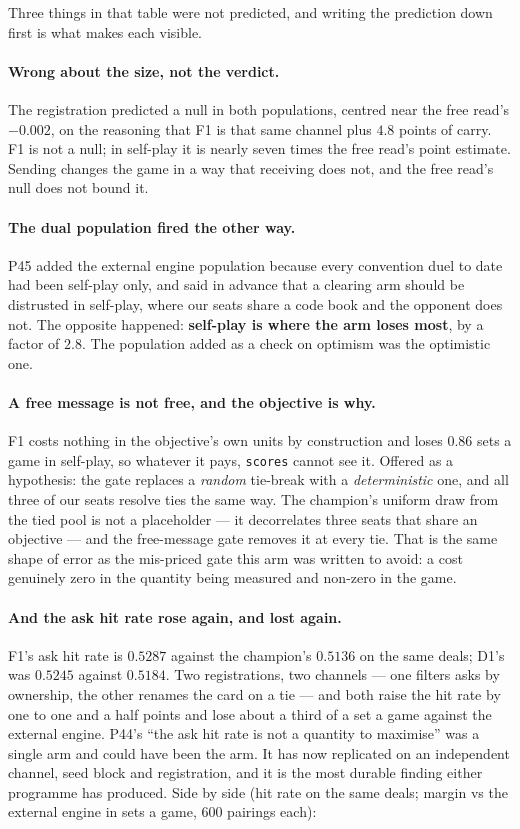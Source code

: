 \documentclass[11pt,letterpaper]{article}
\begin{document}
\noindent Three things in that table were not predicted, and writing the
prediction down first is what makes each visible.

\paragraph{Wrong about the size, not the verdict.} The registration predicted a
null in both populations, centred near the free read's $-0.002$, on the
reasoning that F1 is that same channel plus $4.8$ points of carry. F1 is not a
null; in self-play it is nearly seven times the free read's point estimate.
Sending changes the game in a way that receiving does not, and the free read's
null does not bound it.

\paragraph{The dual population fired the other way.} P45 added the external engine
population because every convention duel to date had been self-play only, and
said in advance that a clearing arm should be distrusted in self-play, where our
seats share a code book and the opponent does not. The opposite happened:
\textbf{self-play is where the arm loses most}, by a factor of $2.8$. The population
added as a check on optimism was the optimistic one.

\paragraph{A free message is not free, and the objective is why.} F1 costs
nothing in the objective's own units by construction and loses $0.86$ sets a
game in self-play, so whatever it pays, \texttt{scores} cannot see it. Offered
as a hypothesis: the gate replaces a \emph{random} tie-break with a
\emph{deterministic} one, and all three of our seats resolve ties the same way.
The champion's uniform draw from the tied pool is not a placeholder --- it
decorrelates three seats that share an objective --- and the free-message gate
removes it at every tie. That is the same shape of error as the mis-priced gate
this arm was written to avoid: a cost genuinely zero in the quantity being
measured and non-zero in the game.

\paragraph{And the ask hit rate rose again, and lost again.}
F1's ask hit rate is $\mathbf{0.5287}$ against the champion's $0.5136$ on the same deals;
D1's was $0.5245$ against $0.5184$. Two registrations, two channels --- one filters asks
by ownership, the other renames the card on a tie --- and both raise the hit
rate by one to one and a half points and lose about a third of a set a game
against the external engine. P44's ``the ask hit rate is not a quantity to maximise'' was a
single arm and could have been the arm. It has now replicated on an independent
channel, seed block and registration, and it is the most durable finding either
programme has produced. Side by side (hit rate on the same deals; margin vs
the external engine in sets a game, $600$ pairings each):
\end{document}
